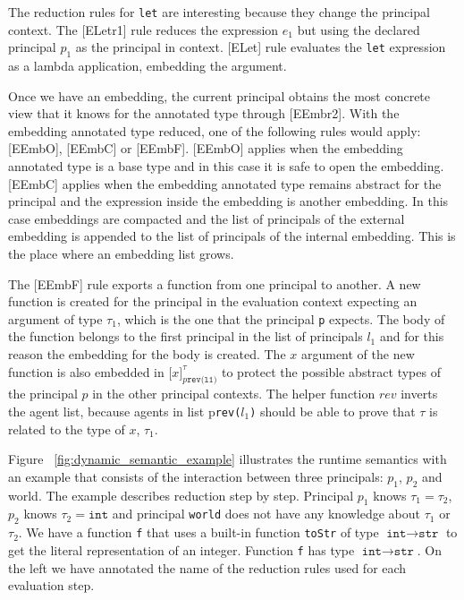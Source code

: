 \documentclass{article}
\newcommand{\emb}[3]{\texttt{[}#1\texttt{]}_{#2}^{#3}}
\newcommand\icode[1]{\texttt{#1}}
\newcommand\irname[1]{[#1]}
\begin{document}
The reduction rules for \icode{let} are interesting because they change the principal context. The \irname{ELetr1} rule reduces the expression $e_1$ but using the declared principal $p_1$ as the principal in context. \irname{ELet} rule evaluates the \icode{let} expression as a lambda application, embedding the argument. 

Once we have an embedding, the current principal obtains the most concrete view that it knows for the annotated type through \irname{EEmbr2}. With the embedding annotated type reduced, one of the following rules would apply: \irname{EEmbO}, \irname{EEmbC} or \irname{EEmbF}. \irname{EEmbO} applies when the embedding annotated type is a base type and in this case it is safe to open the embedding. \irname{EEmbC} applies when the embedding annotated type remains abstract for the principal and the expression inside the embedding is another embedding. In this case embeddings are compacted and the list of principals of the external embedding is appended to the list of principals of the internal embedding. This is the place where an embedding list grows. 

The \irname{EEmbF} rule exports a function from one principal to another. A new function is created for the principal in the evaluation context expecting an argument of type $\tau_1$, which is the one that the principal \icode{p} expects. The body of the function belongs to the first principal in the list of principals \icode{$l_1$} and for this reason the embedding for the body is created. The $x$ argument of the new function is also embedded in $\emb{x}{p\texttt{rev(l1)}}{\tau}$ to protect the possible abstract types of the principal $p$ in the other principal contexts. The helper function $rev$ inverts the agent list, because agents in list p\texttt{rev($l_1$)} should be able to prove that $\tau$ is related to the type of $x$, $\tau_1$. 

Figure ~\ref{fig:dynamic_semantic_example} illustrates the runtime semantics with an example that consists of the interaction between three principals: $p_1$, $p_2$ and {\sf world}. The example  describes reduction step by step. Principal $p_1$ knows $\tau_1 = \tau_2$, $p_2$ knows $\tau_2 = \icode{int}$ and principal \icode{world} does not have any knowledge about $\tau_1$ or $\tau_2$. We have a function \icode{f} that uses a built-in function \icode{toStr} of type $\icode{int} \rightarrow \icode{str}$ to get the literal representation of an integer. Function \icode{f} has type $\icode{int} \rightarrow \icode{str}$. On the left we have annotated the name of the reduction rules used for each evaluation step. 
\end{document}
